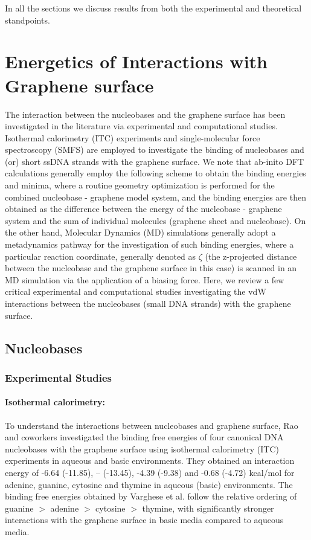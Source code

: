 In all the sections we discuss results from both the experimental and theoretical standpoints.

\section{Energetics of Interactions with Graphene surface}
The interaction between the nucleobases and the graphene surface has been investigated in the literature via experimental and computational studies. Isothermal calorimetry (ITC)  experiments and single-molecular force spectroscopy (SMFS) are employed to investigate the binding of nucleobases and (or) short ssDNA strands with the graphene surface. We note that ab-inito DFT calculations generally employ the following scheme to obtain the binding energies and minima, where a routine geometry optimization is performed for the combined nucleobase - graphene model system, and the binding energies are then obtained as the difference between the energy of the nucleobase - graphene system and the sum of individual molecules (graphene sheet and nucleobase). On the other hand, Molecular Dynamics (MD) simulations generally adopt a metadynamics pathway for the investigation of such binding energies, where a particular reaction coordinate, generally denoted as $\zeta$ (the z-projected distance between the nucleobase and the graphene surface in this case) is scanned in an MD simulation via the application of a biasing force. Here, we review a few critical experimental and computational studies investigating the vdW interactions between the nucleobases (small DNA strands) with the graphene surface.

\subsection{Nucleobases}
\subsubsection{Experimental Studies}
\paragraph{Isothermal calorimetry:}To understand the interactions between nucleobases and graphene surface, Rao and coworkers investigated the binding free energies of four canonical DNA nucleobases with the graphene surface using isothermal calorimetry (ITC) experiments in aqueous and basic environments.\supercite{varghese_binding_2009} They obtained an interaction energy of -6.64 (-11.85), -- (-13.45), -4.39 (-9.38) and -0.68 (-4.72) kcal/mol for adenine, guanine, cytosine and thymine in aqueous (basic) environments. The binding free energies obtained by Varghese et al. follow the relative ordering of guanine $>$ adenine $>$ cytosine $>$ thymine, with significantly stronger interactions with the graphene surface in basic media compared to aqueous media.

